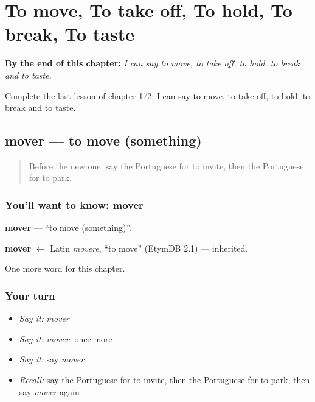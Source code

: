 
\chapter{To move, To take off, To hold, To break, To taste}
\label{ch:pt-to-move-to-take-off-to-hold-to-break-to-taste}

\begin{chapteropening}
\textbf{By the end of this chapter:} \emph{I can say to move, to take off, to hold, to break and to taste.}

Complete the last lesson of chapter 172: I can say to move, to take off, to hold, to break and to taste.
\end{chapteropening}

\section[mover]{mover — to move (something)}

\label{lesson:PT-C172-mover}



\begin{quote}
Before the new one: say the Portuguese for to invite, then the Portuguese for to park.
\end{quote}

\subsection*{You'll want to know: mover}
\textbf{mover} — \textquotedblleft{}to move (something)\textquotedblright{}.

\begin{cousinweb}
\textbf{mover} $\leftarrow$ Latin \emph{movere}, \textquotedblleft{}to move\textquotedblright{} (EtymDB 2.1) — inherited.
\end{cousinweb}

\begin{grammarlens}[title={What you've built}]
One more word for this chapter.
\end{grammarlens}

\subsection*{Your turn}
\begin{itemize}
\raggedright
  \item \emph{Say it:} \emph{mover}
  \item \emph{Say it:} \emph{mover}, once more
  \item \emph{Say it:} say \emph{mover}
  \item \emph{Recall:} say the Portuguese for to invite, then the Portuguese for to park, then say \emph{mover} again
\end{itemize}

